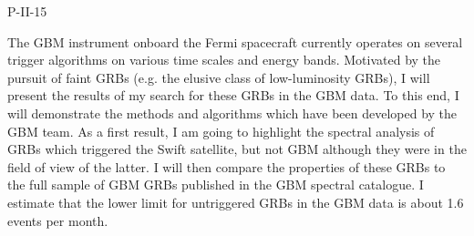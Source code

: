 P-II-15


\bigskip



\bigskip

\noindent The GBM instrument onboard the Fermi spacecraft currently operates on several trigger algorithms on various time scales and energy bands.
Motivated by the pursuit of faint GRBs (e.g. the elusive class of low-luminosity GRBs), I will present the results of my search for these GRBs in the GBM data. To this end, I will demonstrate the methods and algorithms which have been developed by the GBM team.
As a first result, I am going to highlight the spectral analysis of GRBs which triggered the Swift satellite, but not GBM although they were in the field of view of the latter. I will then compare the properties of these GRBs to the full sample of GBM GRBs published in the GBM spectral catalogue.
I estimate that the lower limit for untriggered GRBs in the GBM data is about 1.6 events per month.
